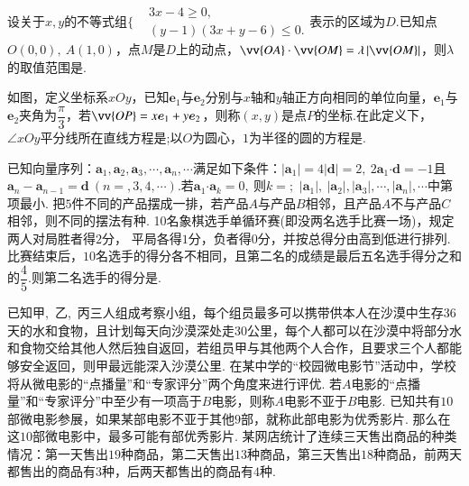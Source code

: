 \documentclass{BHCexam}
\begin{document}
\begin{questions}
\qs 设关于$ x,y $的不等式组$ \Bigg\{\begin{aligned}
&3x-4\ge 0,\\
&\left(y-1\right)\left(3x+y-6\right)\le 0.
\end{aligned} $表示的区域为$ D. $已知点$ O(0,0),~A(1,0) $，点$ M $是$ D $上的动点，$ \vv{OA}\cdot\vv{OM}=\lambda \abs{\vv{OM}} $，则$ \lambda $的取值范围是\tk.

\qs 如图，定义坐标系$ xOy $，已知$ \bm{e}_1 $与$ \bm{e}_2 $分别与$x$轴和$y$轴正方向相同的单位向量，$\bm{e}_1$与$\bm{e}_2$夹角为$ \dfrac{\pi}{3} $，若$ \vv{OP}=x\bm{e}_1+y\bm{e}_2 $，则称$ (x,y) $是点$ P $的坐标.在此定义下，$ \angle xOy $平分线所在直线方程是\tk;以$ O $为圆心，$ 1 $为半径的圆的方程是\tk.
\begin{center}
\end{center}

\qs 已知向量序列：$ \bm{a}_1,\bm{a}_2,\bm{a}_3,\cdots,\bm{a}_n,\cdots $满足如下条件：$ \left|\bm{a}_1\right|=4\left|\bm{d}\right|=2,~2\bm{a}_1\bm\cdot \bm{d}=-1 $且$ \bm{a}_n-\bm{a}_{n-1}=
\bm{d}~(n=,3,4,\cdots). $若$ \bm{a}_1\bm{\cdot}\bm{a}_k=0,~ $则$ k= $\tk;~$ \left|\bm{a}_1\right|,~  \left|\bm{a}_2\right|, \left|\bm{a}_3\right|,\cdots, \left|\bm{a}_n\right|,\cdots$中第\tk 项最小.
\qs 把$ 5 $件不同的产品摆成一排，若产品$ A $与产品$ B $相邻，且产品$ A $不与产品$ C $相邻，则不同的摆法有\tk 种.
\qs 10名象棋选手单循环赛(即没两名选手比赛一场)，规定两人对局胜者得$ 2 $分， 平局各得$ 1 $分，负者得$ 0 $分，并按总得分由高到低进行排列.比赛结束后，$ 10 $名选手的得分各不相同，且第二名的成绩是最后五名选手得分之和的$ \dfrac{4}{5} $.则第二名选手的得分是\tk. 



\qs 已知甲,~乙,~丙三人组成考察小组，每个组员最多可以携带供本人在沙漠中生存36天的水和食物，且计划每天向沙漠深处走30公里，每个人都可以在沙漠中将部分水和食物交给其他人然后独自返回，若组员甲与其他两个人合作，且要求三个人都能够安全返回，则甲最远能深入沙漠\tk 公里.
\qs 在某中学的“校园微电影节”活动中，学校将从微电影的“点播量”和“专家评分”两个角度来进行评优. 若$A$电影的“点播量”和“专家评分”中至少有一项高于$B$电影，则称$A$电影不亚于$B$电影. 已知共有$10$部微电影参展，如果某部电影不亚于其他$9$部，就称此部电影为优秀影片. 那么在这$10$部微电影中，最多可能有\tk 部优秀影片.
\qs 某网店统计了连续三天售出商品的种类情况：第一天售出$ 19 $种商品，第二天售出$ 13 $种商品，第三天售出$ 18 $种商品，前两天都售出的商品有$ 3 $种，后两天都售出的商品有$ 4 $种.
\begin{parts}

\end{parts}
\end{questions}
\end{document}
